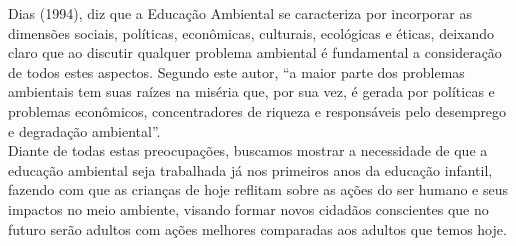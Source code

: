 Dias (1994), diz que a Educação Ambiental se caracteriza por incorporar as dimensões sociais, políticas, econômicas, culturais, ecológicas e éticas, deixando claro que ao discutir qualquer problema ambiental é fundamental a consideração de todos estes aspectos. Segundo este autor, “a maior parte dos problemas ambientais tem suas raízes na miséria que, por sua vez, é gerada por políticas e problemas econômicos, concentradores de riqueza e responsáveis pelo desemprego e degradação ambiental”.\\

Diante de todas estas preocupações, buscamos mostrar a necessidade de que a educação ambiental seja trabalhada já nos primeiros anos da educação infantil, fazendo com que as crianças de hoje reflitam sobre as ações do ser humano e seus impactos no meio ambiente, visando formar novos cidadãos conscientes que no futuro serão adultos com ações melhores comparadas aos adultos que temos hoje.\\
